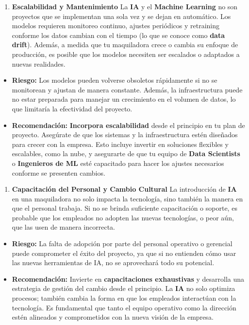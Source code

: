 \documentclass[
  10pt,
  letterpaper,
]{book}
\providecommand{\tightlist}{%
  \setlength{\itemsep}{0pt}\setlength{\parskip}{0pt}}\usepackage{longtable,booktabs,array}
\begin{document}
\begin{enumerate}
\def\labelenumi{\arabic{enumi}.}
\setcounter{enumi}{3}
\tightlist
\item
  \textbf{Escalabilidad y Mantenimiento} La \textbf{IA} y el
  \textbf{Machine Learning} no son proyectos que se implementan una sola
  vez y se dejan en automático. Los modelos requieren monitoreo
  continuo, ajustes periódicos y retraining conforme los datos cambian
  con el tiempo (lo que se conoce como \textbf{data drift}). Además, a
  medida que tu maquiladora crece o cambia su enfoque de producción, es
  posible que los modelos necesiten ser escalados o adaptados a nuevas
  realidades.
\end{enumerate}

\begin{itemize}
\item
  \textbf{Riesgo:} Los modelos pueden volverse obsoletos rápidamente si
  no se monitorean y ajustan de manera constante. Además, la
  infraestructura puede no estar preparada para manejar un crecimiento
  en el volumen de datos, lo que limitaría la efectividad del proyecto.
\item
  \textbf{Recomendación:} \textbf{Incorpora escalabilidad} desde el
  principio en tu plan de proyecto. Asegúrate de que los sistemas y la
  infraestructura estén diseñados para crecer con la empresa. Esto
  incluye invertir en soluciones flexibles y escalables, como la nube, y
  asegurarte de que tu equipo de \textbf{Data Scientists} o
  \textbf{Ingenieros de ML} esté capacitado para hacer los ajustes
  necesarios conforme se presenten cambios.
\end{itemize}

\begin{enumerate}
\def\labelenumi{\arabic{enumi}.}
\setcounter{enumi}{4}
\tightlist
\item
  \textbf{Capacitación del Personal y Cambio Cultural} La introducción
  de \textbf{IA} en una maquiladora no solo impacta la tecnología, sino
  también la manera en que el personal trabaja. Si no se brinda
  suficiente capacitación o soporte, es probable que los empleados no
  adopten las nuevas tecnologías, o peor aún, que las usen de manera
  incorrecta.
\end{enumerate}

\begin{itemize}
\item
  \textbf{Riesgo:} La falta de adopción por parte del personal operativo
  o gerencial puede comprometer el éxito del proyecto, ya que si no
  entienden cómo usar las nuevas herramientas de IA, no se aprovechará
  todo su potencial.
\item
  \textbf{Recomendación:} Invierte en \textbf{capacitaciones
  exhaustivas} y desarrolla una estrategia de gestión del cambio desde
  el principio. La \textbf{IA} no solo optimiza procesos; también cambia
  la forma en que los empleados interactúan con la tecnología. Es
  fundamental que tanto el equipo operativo como la dirección estén
  alineados y comprometidos con la nueva visión de la empresa.
\end{itemize}
\end{document}
